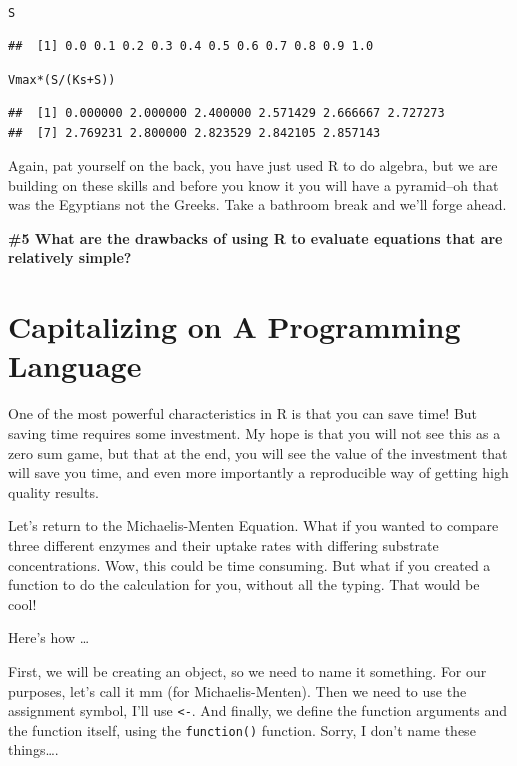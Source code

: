 \documentclass{tufte-handout}\usepackage[]{graphicx}\usepackage[]{color}
\makeatletter
\newcommand{\hlopt}[1]{\textcolor[rgb]{0,0,0}{#1}}%
\newcommand{\hlstd}[1]{\textcolor[rgb]{0.345,0.345,0.345}{#1}}%
\newenvironment{kframe}{%
 \def\at@end@of@kframe{}%
 \ifinner\ifhmode%
  \def\at@end@of@kframe{\end{minipage}}%
  \begin{minipage}{\columnwidth}%
 \fi\fi%
 \def\FrameCommand##1{\hskip\@totalleftmargin \hskip-\fboxsep
 \colorbox{shadecolor}{##1}\hskip-\fboxsep
     \hskip-\linewidth \hskip-\@totalleftmargin \hskip\columnwidth}%
 \MakeFramed {\advance\hsize-\width
   \@totalleftmargin\z@ \linewidth\hsize
   \@setminipage}}%
 {\par\unskip\endMakeFramed%
 \at@end@of@kframe}
\newenvironment{knitrout}{}{} %
\makeatother
\begin{document}
\begin{knitrout}
\color{fgcolor}\begin{kframe}
\begin{alltt}
\hlstd{S}
\end{alltt}
\begin{verbatim}
##  [1] 0.0 0.1 0.2 0.3 0.4 0.5 0.6 0.7 0.8 0.9 1.0
\end{verbatim}
\begin{alltt}
\hlstd{Vmax}\hlopt{*}\hlstd{(S}\hlopt{/}\hlstd{(Ks} \hlopt{+} \hlstd{S))}
\end{alltt}
\begin{verbatim}
##  [1] 0.000000 2.000000 2.400000 2.571429 2.666667 2.727273
##  [7] 2.769231 2.800000 2.823529 2.842105 2.857143
\end{verbatim}
\end{kframe}
\end{knitrout}

Again, pat yourself on the back, you have just used R to do algebra, but we are building on these skills and before you know it you will have a pyramid--oh that was the Egyptians not the Greeks. Take a bathroom break and we'll forge ahead.

\bigskip
\noindent \textbf{\#5 What are the drawbacks of using R to evaluate equations that are relatively simple? }

\section{Capitalizing on A Programming Language}

One of the most powerful characteristics in R is that you can save time! But saving time requires some investment. My hope is that you will not see this as a zero sum game, but that at the end, you will see the value of the investment that will save you time, and even more importantly a reproducible way of getting high quality results. 

Let's return to the Michaelis-Menten Equation. What if you wanted to compare three different enzymes and their uptake rates with differing substrate concentrations. Wow, this could be time consuming. But what if you created a function to do the calculation for you, without all the typing. That would be cool!

\noindent Here's how \ldots

First, we will be creating an object, so we need to name it something. For our purposes, let's call it mm (for Michaelis-Menten). Then we need to use the assignment symbol, I'll use \texttt{<-}. And finally, we define the function arguments and the function itself, using the \texttt{function()} function. Sorry, I don't name these things\ldots. 
\end{document}
